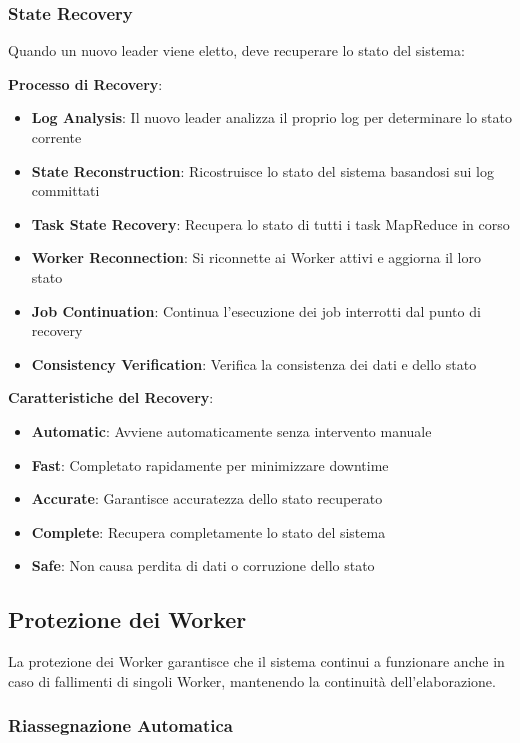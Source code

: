 \documentclass[12pt,a4paper]{article}
\begin{document}
\subsubsection{State Recovery}

Quando un nuovo leader viene eletto, deve recuperare lo stato del sistema:

\textbf{Processo di Recovery}:
\begin{itemize}
\item \textbf{Log Analysis}: Il nuovo leader analizza il proprio log per determinare lo stato corrente
\item \textbf{State Reconstruction}: Ricostruisce lo stato del sistema basandosi sui log committati
\item \textbf{Task State Recovery}: Recupera lo stato di tutti i task MapReduce in corso
\item \textbf{Worker Reconnection}: Si riconnette ai Worker attivi e aggiorna il loro stato
\item \textbf{Job Continuation}: Continua l'esecuzione dei job interrotti dal punto di recovery
\item \textbf{Consistency Verification}: Verifica la consistenza dei dati e dello stato
\end{itemize}

\textbf{Caratteristiche del Recovery}:
\begin{itemize}
\item \textbf{Automatic}: Avviene automaticamente senza intervento manuale
\item \textbf{Fast}: Completato rapidamente per minimizzare downtime
\item \textbf{Accurate}: Garantisce accuratezza dello stato recuperato
\item \textbf{Complete}: Recupera completamente lo stato del sistema
\item \textbf{Safe}: Non causa perdita di dati o corruzione dello stato
\end{itemize}

\subsection{Protezione dei Worker}

La protezione dei Worker garantisce che il sistema continui a funzionare anche in caso di fallimenti di singoli Worker, mantenendo la continuità dell'elaborazione.

\subsubsection{Riassegnazione Automatica}
\end{document}
